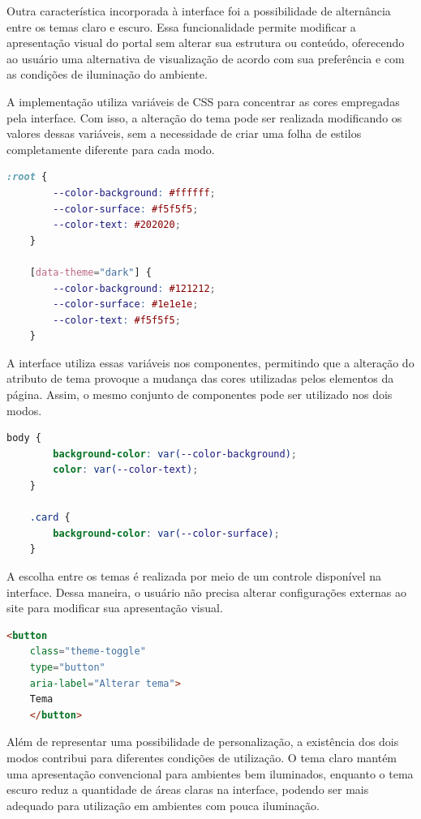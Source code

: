 Outra característica incorporada à interface foi a possibilidade de alternância entre os temas claro e escuro. Essa funcionalidade permite modificar a apresentação visual do portal sem alterar sua estrutura ou conteúdo, oferecendo ao usuário uma alternativa de visualização de acordo com sua preferência e com as condições de iluminação do ambiente.

A implementação utiliza variáveis de CSS para concentrar as cores empregadas pela interface. Com isso, a alteração do tema pode ser realizada modificando os valores dessas variáveis, sem a necessidade de criar uma folha de estilos completamente diferente para cada modo.

\begin{lstlisting}[language=CSS, caption={Utilização de variáveis para os temas da interface.}, label={lst:themes}]
	:root {
		--color-background: #ffffff;
		--color-surface: #f5f5f5;
		--color-text: #202020;
	}
	
	[data-theme="dark"] {
		--color-background: #121212;
		--color-surface: #1e1e1e;
		--color-text: #f5f5f5;
	}
\end{lstlisting}

A interface utiliza essas variáveis nos componentes, permitindo que a alteração do atributo de tema provoque a mudança das cores utilizadas pelos elementos da página. Assim, o mesmo conjunto de componentes pode ser utilizado nos dois modos.

\begin{lstlisting}[language=CSS, caption={Aplicação das variáveis de tema aos elementos da interface.}, label={lst:themeuse}]
	body {
		background-color: var(--color-background);
		color: var(--color-text);
	}
	
	.card {
		background-color: var(--color-surface);
	}
\end{lstlisting}

A escolha entre os temas é realizada por meio de um controle disponível na interface. Dessa maneira, o usuário não precisa alterar configurações externas ao site para modificar sua apresentação visual.

\begin{lstlisting}[language=HTML, caption={Controle de alternância entre os temas.}, label={lst:themetoggle}]
	<button
	class="theme-toggle"
	type="button"
	aria-label="Alterar tema">
	Tema
	</button>
\end{lstlisting}

Além de representar uma possibilidade de personalização, a existência dos dois modos contribui para diferentes condições de utilização. O tema claro mantém uma apresentação convencional para ambientes bem iluminados, enquanto o tema escuro reduz a quantidade de áreas claras na interface, podendo ser mais adequado para utilização em ambientes com pouca iluminação.
